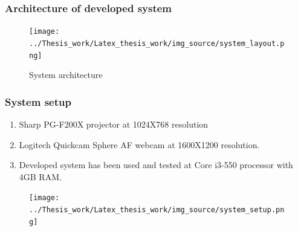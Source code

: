 \documentclass[9pt]{beamer}
\begin{document}
\begin{frame}
\frametitle{Architecture of developed system}
\begin{figure}
\texttt{[image: ../Thesis\_work/Latex\_thesis\_work/img\_source/system\_layout.png]}
\caption{System architecture}
\end{figure}
\end{frame}

\begin{frame}
\frametitle{System setup}
\begin{enumerate}
\item Sharp PG-F200X projector at 1024X768 resolution
\item Logitech Quickcam Sphere AF webcam at 1600X1200 resolution.
\item Developed system has been used and tested at Core i3-550 processor with 4GB RAM.
\end{enumerate}

\begin{figure}
\texttt{[image: ../Thesis\_work/Latex\_thesis\_work/img\_source/system\_setup.png]}
\end{figure}
\end{frame}
\end{document}
